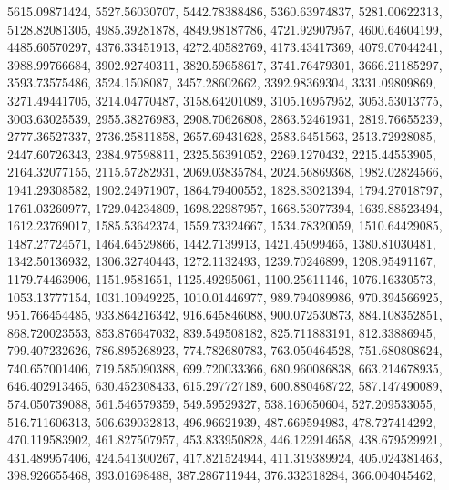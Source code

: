 \begin{code}
\begin{hide}
{     5615.09871424,     5527.56030707,     5442.78388486,
     5360.63974837,     5281.00622313,     5128.82081305,
     4985.39281878,     4849.98187786,     4721.92907957,
     4600.64604199,     4485.60570297,     4376.33451913,
     4272.40582769,     4173.43417369,     4079.07044241,
     3988.99766684,     3902.92740311,     3820.59658617,
     3741.76479301,     3666.21185297,     3593.73575486,
      3524.1508087,     3457.28602662,     3392.98369304,
     3331.09809869,     3271.49441705,     3214.04770487,
     3158.64201089,     3105.16957952,     3053.53013775,
     3003.63025539,     2955.38276983,     2908.70626808,
     2863.52461931,     2819.76655239,     2777.36527337,
     2736.25811858,     2657.69431628,      2583.6451563,
     2513.72928085,     2447.60726343,     2384.97598811,
     2325.56391052,      2269.1270432,     2215.44553905,
     2164.32077155,     2115.57282931,     2069.03835784,
     2024.56869368,     1982.02824566,     1941.29308582,
     1902.24971907,     1864.79400552,     1828.83021394,
     1794.27018797,     1761.03260977,     1729.04234809,
     1698.22987957,     1668.53077394,     1639.88523494,
     1612.23769017,     1585.53642374,     1559.73324667,
     1534.78320059,     1510.64429085,     1487.27724571,
     1464.64529866,      1442.7139913,     1421.45099465,
     1380.81030481,     1342.50136932,     1306.32740443,
      1272.1132493,     1239.70246899,     1208.95491167,
     1179.74463906,      1151.9581651,     1125.49295061,
     1100.25611146,     1076.16330573,     1053.13777154,
     1031.10949225,     1010.01446977,     989.794089986,
     970.394566925,     951.766454485,     933.864216342,
     916.645846088,     900.072530873,     884.108352851,
     868.720023553,     853.876647032,     839.549508182,
     825.711883191,      812.33886945,     799.407232626,
     786.895268923,     774.782680783,     763.050464528,
     751.680808624,     740.657001406,     719.585090388,
     699.720033366,     680.960086838,     663.214678935,
     646.402913465,     630.452308433,     615.297727189,
     600.880468722,     587.147490089,     574.050739088,
     561.546579359,      549.59529327,     538.160650604,
     527.209533055,     516.711606313,     506.639032813,
      496.96621939,     487.669594983,     478.727414292,
     470.119583902,     461.827507957,     453.833950828,
     446.122914658,     438.679529921,     431.489957406,
     424.541300267,     417.821524944,     411.319389924,
     405.024381463,     398.926655468,      393.01698488,
     387.286711944,     376.332318284,     366.004045462,
}
\end{hide}
\end{code}
